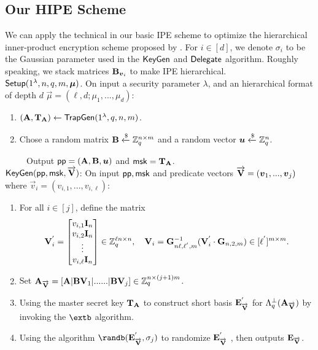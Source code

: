\subsection{Our HIPE Scheme}
We can apply the technical in our basic IPE scheme to optimize the hierarchical inner-product encryption scheme proposed by \cite{PKC:Xagawa13}.  For $i \in [d]$, we denote $\sigma_{i}$ to be the Gaussian parameter used in the $\mathsf{KeyGen}$ and $\mathsf{Delegate}$ algorithm. Roughly speaking, we stack matrices $\mathbf{B}_{\boldsymbol{v}_{i}}$ to make IPE hierarchical.\\[0.4cm]
$\mathsf{Setup}(1^{\lambda}, n, q, m, \boldsymbol{\mu})$. On input a security parameter $\lambda$, and an hierarchical format of depth $d$ $\vec{\mu}=(\ell,d;\mu_{1},...,\mu_{d})$:
\begin{enumerate}
\item $(\mathbf{A}, \mathbf{T}_{\mathbf{A}})\leftarrow \mathsf{TrapGen}(1^{\lambda}, q, n, m)$.
\item Chose a random matrix $\mathbf{B}\xleftarrow{\$} \mathbb{Z}^{n \times m}_{q}$ and a random vector $\boldsymbol{u}\xleftarrow{\$} \mathbb{Z}^{n}_{q}$.
\end{enumerate}
~~~~~Output $\mathsf{pp}=(\mathbf{A}, \mathbf{B}, \boldsymbol{u})$ and $\mathsf{msk}= \mathbf{T}_{\mathbf{A}}$.\\[0.4cm]
$\mathsf{KeyGen}(\mathsf{pp}, \mathsf{msk}, \overrightarrow{\mathbf{V}})$: On input $\mathsf{pp}, \mathsf{msk}$ and predicate vectors $\overrightarrow{\mathbf{V}}=(\boldsymbol{v}_{1},...,\boldsymbol{v}_{j})$ where $\vec{v}_{i}=(v_{i,1},...,v_{i,\ell})$:
\begin{enumerate}
\item For all $i \in [j]$, define the matrix
\begin{equation}
\mathbf{V}^{'}_{i}= \begin{bmatrix}
v_{i,1} \mathbf{I}_{n}\\
v_{i,2} \mathbf{I}_{n}\\
\vdots\\
v_{i,\ell} \mathbf{I}_{n}
\end{bmatrix} \in \mathbb{Z}^{\ell n \times n}_{q},~~~ \mathbf{V}_{i}=\mathbf{G}^{-1}_{n\ell,\ell^{'},m}(\mathbf{V}^{'}_{i}\cdot \mathbf{G}_{n,2,m}) \in [\ell^{'}]^{m \times m}.
\end{equation}
\item Set  $\mathbf{A}_{\overrightarrow{\mathbf{V}}}=[\mathbf{A} | \mathbf{B}\mathbf{V}_{1}| ...... | \mathbf{B}\mathbf{V}_{j}] \in \mathbb{Z}^{n \times (j+1)m}_{q}$.
\item Using the master secret key $\mathbf{T}_{\mathbf{A}}$ to construct short basis $\mathbf{E}^{'}_{\overrightarrow{\mathbf{V}}}$ for  $\Lambda^{\perp}_{q}(\mathbf{A}_{\overrightarrow{\mathbf{V}}})$  by  invoking the $\extb$ algorithm.
\item Using the algorithm $\randb(\mat{E}^{'}_{\overrightarrow{\mat{V}}}, \sigma_{j})$ to randomize $\mathbf{E}^{'}_{\overrightarrow{\mathbf{V}}}$ , then outputs $\mathbf{E}_{\overrightarrow{\mathbf{V}}}$.
\end{enumerate}
